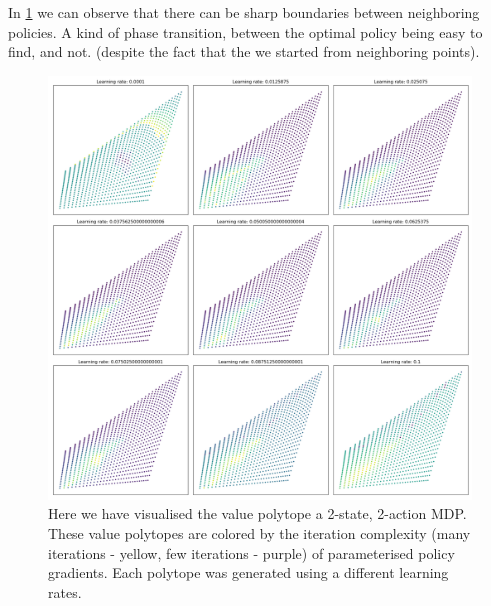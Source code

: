 In \ref{fig:iteration-complexity} we can observe that there can be sharp boundaries
between neighboring policies. A kind of phase transition, between the optimal policy being easy to find, and not.
(despite the fact that the we started from neighboring points).

\begin{figure}
\label{fig:iteration-complexity}
\centering
\includegraphics[width=1.0\textwidth,height=1.0\textheight]{../../pictures/figures/iteration-lr-0.png}
\caption{Here we have visualised the value polytope a 2-state, 2-action MDP.
These value polytopes are colored by the iteration complexity (many iterations - yellow, few iterations - purple) of parameterised policy gradients.
Each polytope was generated using a different learning rates.}
\end{figure}




